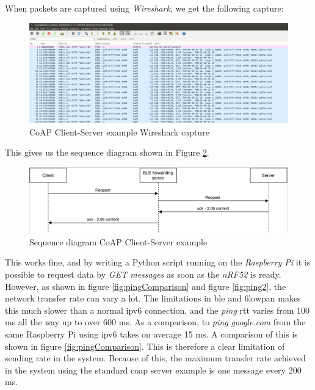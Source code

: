 When packets are captured using \textit{Wireshark}, we get the following capture: 

\begin{figure}[ht]
    \centering
    \includegraphics[scale=0.27]{CoapEx1captureCropped2.png}    
    \caption{CoAP Client-Server example Wireshark capture}
    \label{fig:CoAPexample1}
\end{figure}


This gives us the sequence diagram shown in Figure \ref{fig:seq1}. 

\begin{figure}[ht]
    \centering
    \includegraphics[scale=0.27]{seq1.png}    
    \caption{Sequence diagram CoAP Client-Server example}
    \label{fig:seq1}
\end{figure}


This works fine, and by writing a Python script running on the \textit{Raspberry Pi} it is possible to request data by \textit{GET messages} as soon as the \textit{nRF52} is ready. However, as shown in figure \ref{fig:pingComparison} and figure \ref{fig:ping2}, the network transfer rate can vary a lot. The limitations in \gls{ble} and \gls{6lowpan} makes this much slower than a normal \gls{ipv6} connection, and the \textit{ping} \gls{rtt} varies from 100 ms all the way up to over 600 ms. As a comparison, to \textit{ping google.com} from the same Raspberry Pi using \gls{ipv6} takes on average 15 ms. A comparison of this is shown in figure \ref{fig:pingComparison}. This is therefore a clear limitation of sending rate in the system. Because of this, the maximum transfer rate achieved in the system using the standard \gls{coap} server example is one message every 200 ms. 

